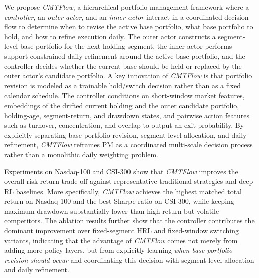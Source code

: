 \documentclass[letterpaper]{article} %
\begin{document}
We propose \textit{CMTFlow}, a hierarchical portfolio management framework where a \emph{controller}, an \emph{outer actor}, and an \emph{inner actor} interact in a coordinated decision flow to determine when to revise the active base portfolio, what base portfolio to hold, and how to refine execution daily. The outer actor constructs a segment-level base portfolio for the next holding segment, the inner actor performs support-constrained daily refinement around the active base portfolio, and the controller decides whether the current base should be held or replaced by the outer actor's candidate portfolio. A key innovation of \textit{CMTFlow} is that portfolio revision is modeled as a trainable hold/switch decision rather than as a fixed calendar schedule. The controller conditions on short-window market features, embeddings of the drifted current holding and the outer candidate portfolio, holding-age, segment-return, and drawdown states, and pairwise action features such as turnover, concentration, and overlap to output an exit probability. By explicitly separating base-portfolio revision, segment-level allocation, and daily refinement, \textit{CMTFlow} reframes PM as a coordinated multi-scale decision process rather than a monolithic daily weighting problem.

Experiments on Nasdaq-100 and CSI-300 show that \textit{CMTFlow} improves the overall risk-return trade-off against representative traditional strategies and deep RL baselines. More specifically, \textit{CMTFlow} achieves the highest matched total return on Nasdaq-100 and the best Sharpe ratio on CSI-300, while keeping maximum drawdown substantially lower than high-return but volatile competitors. The ablation results further show that the controller contributes the dominant improvement over fixed-segment HRL and fixed-window switching variants, indicating that the advantage of \textit{CMTFlow} comes not merely from adding more policy layers, but from explicitly learning \emph{when base-portfolio revision should occur} and coordinating this decision with segment-level allocation and daily refinement.
\end{document}
